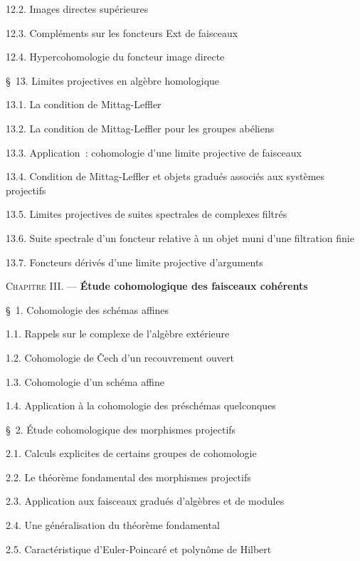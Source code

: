 \begin{flushleft}
12.2. Images directes supérieures 

12.3. Compléments sur les foncteurs Ext de faisceaux 

12.4. Hypercohomologie du foncteur image directe 


\S~13. Limites projectives en algèbre homologique 

13.1. La condition de Mittag-Leffler 

13.2. La condition de Mittag-Leffler pour les groupes abéliens 

13.3. Application~: cohomologie d'une limite projective de faisceaux 

13.4. Condition de Mittag-Leffler et objets gradués associés aux systèmes
projectifs 

13.5. Limites projectives de suites spectrales de complexes filtrés 

13.6. Suite spectrale d'un foncteur relative à un objet muni d'une filtration
finie 

13.7. Foncteurs dérivés d'une limite projective d'arguments 

\medskip
\textsc{Chapitre III.} --- \textbf{Étude cohomologique des faisceaux
cohérents} 

\medskip
\S~1. Cohomologie des schémas affines 

1.1. Rappels sur le complexe de l'algèbre extérieure 

1.2. Cohomologie de Čech d'un recouvrement ouvert 

1.3. Cohomologie d'un schéma affine 

1.4. Application à la cohomologie des préschémas quelconques 

\medskip
\S~2. Étude cohomologique des morphismes projectifs 

2.1. Calculs explicites de certains groupes de cohomologie 

2.2. Le théorème fondamental des morphismes projectifs 

2.3. Application aux faisceaux gradués d'algèbres et de modules 

2.4. Une généralisation du théorème fondamental 

2.5. Caractéristique d'Euler-Poincaré et polynôme de Hilbert 


\end{flushleft}
